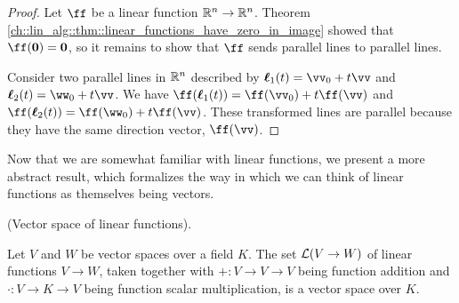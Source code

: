 \begin{proof}
   Let $\ff$ be a linear function $\mathbb{R}^n \rightarrow \mathbb{R}^n$. Theorem \ref{ch::lin_alg::thm::linear_functions_have_zero_in_image} showed that $\ff(\mathbf{0}) = \mathbf{0}$, so it remains to show that $\ff$ sends parallel lines to parallel lines. 
   
   Consider two parallel lines in $\mathbb{R}^n$ described by $\eell_1(t) = \vv_0 + t\vv$ and $\eell_2(t) = \ww_0 + t\vv$. We have $\ff(\eell_1(t)) = \ff(\vv_0) + t \ff(\vv)$ and $\ff(\eell_2(t)) = \ff(\ww_0) + t \ff(\vv)$. These transformed lines are parallel because they have the same direction vector, $\ff(\vv)$.
\end{proof}

Now that we are somewhat familiar with linear functions, we present a more abstract result, which formalizes the way in which we can think of linear functions as themselves being vectors.

\begin{theorem}
\label{ch::lin_alg::thm::vector_space_linear_functions}
    (Vector space of linear functions).

    Let $V$ and $W$ be vector spaces over a field $K$. The set $\mathcal{L}(V \rightarrow W)$ of linear functions $V \rightarrow W$, taken together with $+:V \rightarrow V \rightarrow V$ being function addition and $\cdot:V \rightarrow K \rightarrow V$ being function scalar multiplication, is a vector space over $K$.
\end{theorem}

